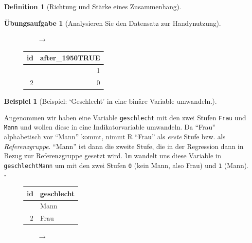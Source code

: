 \documentclass[
  a4paper,
  DIV=11]{scrreprt}
\theoremstyle{definition}
\newtheorem{exercise}{Übungsaufgabe}[chapter]
\theoremstyle{definition}
\newtheorem{example}{Beispiel}[chapter]
\theoremstyle{definition}
\newtheorem{definition}{Definition}[chapter]
\theoremstyle{remark}
\begin{document}
\begin{definition}[Richtung und Stärke eines
Zusammenhang]
\begin{exercise}[Analysieren Sie den Datensatz zur
Handynutzung]
\begin{figure}
\begin{minipage}{0.40\linewidth}
\end{minipage}%
%
\begin{minipage}{0.20\linewidth}
\(\qquad \rightarrow\)\end{minipage}%
%
\begin{minipage}{0.40\linewidth}

\begin{longtable}[]{@{}rr@{}}
\toprule\noalign{}
id & after\_1950TRUE \\
\midrule\noalign{}
\endhead
\bottomrule\noalign{}
\endlastfoot
1 & 1 \\
2 & 0 \\
\end{longtable}

\end{minipage}%

\end{figure}%

\begin{example}[Beispiel: `Geschlecht' in eine binäre Variable
umwandeln.]\protect\hypertarget{exm-bin-trans}{}\label{exm-bin-trans}

Angenommen wir haben eine Variable \texttt{geschlecht} mit den zwei
Stufen \texttt{Frau} und \texttt{Mann} und wollen diese in eine
Indikatorvariable umwandeln. Da ``Frau'' alphabetisch vor ``Mann''
kommt, nimmt R ``Frau'' als \emph{erste} Stufe bzw. als
\emph{Referenzgruppe}. ``Mann'' ist dann die zweite Stufe, die in der
Regression dann in Bezug zur Referenzgruppe gesetzt wird. \texttt{lm}
wandelt uns diese Variable in \texttt{geschlechtMann} um mit den zwei
Stufen \texttt{0} (kein Mann, also Frau) und \texttt{1}
(Mann).\(\square\)

\end{example}

\begin{figure}

\begin{minipage}{0.40\linewidth}

\begin{longtable}[]{@{}rl@{}}
\toprule\noalign{}
id & geschlecht \\
\midrule\noalign{}
\endhead
\bottomrule\noalign{}
\endlastfoot
1 & Mann \\
2 & Frau \\
\end{longtable}

\end{minipage}%
%
\begin{minipage}{0.20\linewidth}
\(\qquad \rightarrow\)\end{minipage}%
%
\begin{minipage}{0.40\linewidth}


\end{minipage}
\end{figure}
\end{exercise}
\end{definition}
\end{document}
